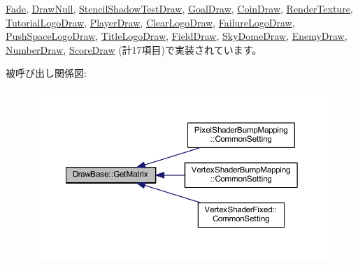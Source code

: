 \mbox{\hyperlink{class_fade_a6aed6912ebf9c243c52cb82f298d8d64}{Fade}}, \mbox{\hyperlink{class_draw_null_adede079e9c11a756090740b20bb43022}{Draw\+Null}}, \mbox{\hyperlink{class_stencil_shadow_test_draw_adfa99798c61ac13f209dc99f1e2694c5}{Stencil\+Shadow\+Test\+Draw}}, \mbox{\hyperlink{class_goal_draw_a50fa9ceaaecdff9910e0f91e65ad9e95}{Goal\+Draw}}, \mbox{\hyperlink{class_coin_draw_a8f5fd8668a4c66fe31446cc6f7c4afd7}{Coin\+Draw}}, \mbox{\hyperlink{class_render_texture_a0e9746f5cebdd088f2303e18cbc52eae}{Render\+Texture}}, \mbox{\hyperlink{class_tutorial_logo_draw_ab700e592d00574dff6ee342138343d7b}{Tutorial\+Logo\+Draw}}, \mbox{\hyperlink{class_player_draw_a8edf1441ea23f298c6a0ca707f54021a}{Player\+Draw}}, \mbox{\hyperlink{class_clear_logo_draw_af5d12b717020101e5c956cf3574f0e2a}{Clear\+Logo\+Draw}}, \mbox{\hyperlink{class_failure_logo_draw_aefc4be9e6ead4d90a5fc9c22cc07fe92}{Failure\+Logo\+Draw}}, \mbox{\hyperlink{class_push_space_logo_draw_a1ab6229ba2d68b730797f5016c99f359}{Push\+Space\+Logo\+Draw}}, \mbox{\hyperlink{class_title_logo_draw_af21cd1dbd79c741a2e3ca2b8e26c5f61}{Title\+Logo\+Draw}}, \mbox{\hyperlink{class_field_draw_a2629b4c4cd8e240e39c65b879c6e82b6}{Field\+Draw}}, \mbox{\hyperlink{class_sky_dome_draw_ab947a3d43975a6d95149bc112c08ce05}{Sky\+Dome\+Draw}}, \mbox{\hyperlink{class_enemy_draw_a6f2a052a45caf0d255112cbe81b8bfa3}{Enemy\+Draw}}, \mbox{\hyperlink{class_number_draw_a78f50afa05e728811d89a491f5eec899}{Number\+Draw}}, \mbox{\hyperlink{class_score_draw_a62aa20ef4b40544bf0a95770b925c780}{Score\+Draw}} (計17項目)で実装されています。

被呼び出し関係図\+:\nopagebreak
\begin{figure}[H]
\begin{center}
\leavevmode
\includegraphics[width=350pt]{class_draw_base_a01239bf362040f7f2ef5e5f5371dcf18_icgraph}
\end{center}
\end{figure}
\mbox{\label{class_draw_base_a194eb48924f205d60d4e63c5becdd2fe}} 
